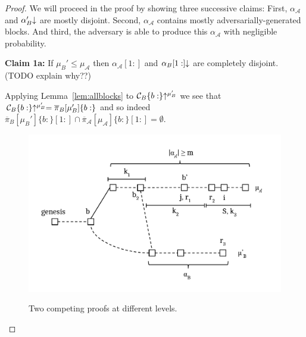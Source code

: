 \begin{proof}
%

%

    We will proceed in the proof by showing three successive claims: First,
    $\alpha_\mathcal{A}$ and $\alpha'_B\negthickspace\downarrow$ are mostly
    disjoint. Second, $\alpha_\mathcal{A}$ contains mostly
    adversarially-generated blocks. And third, the adversary is able to produce
    this $\alpha_\mathcal{A}$ with negligible probability.

    \textbf{Claim 1a: } If $\mu_B' \leq \mu_\mathcal{A}$ then
    $\alpha_\mathcal{A}[1:]$ and $\alpha_B[1:]\negthickspace\downarrow$ are completely
    disjoint. (TODO explain why??)

    Applying Lemma~\ref{lem:allblocks}
    to $\mathcal{C}_B\{b:\}\negthickspace\uparrow^{\mu_B'}$ we see that
    $\mathcal{C}_B\{b:\}\negthickspace\uparrow^{\mu_B'} = \overline\pi_B[\mu_B']\{b:\}$ and so
    indeed
    $\overline\pi_B[\mu_B']\{b:\}[1:] \cap
    \overline\pi_\mathcal{A}[\mu_\mathcal{A}]\{b:\}[1:] = \emptyset$.

    \begin{figure}
        \caption{Two competing proofs at different levels.}
        \centering
        \includegraphics[width=\columnwidth,keepaspectratio]{figures/security-proof-chain.pdf}
        \label{fig.sec-comparison}
    \end{figure}


\end{proof}
